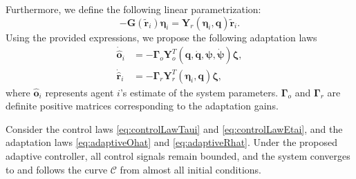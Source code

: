 Furthermore, we define the following linear parametrization:
\begin{equation}
    -\mathbf{G}(\widetilde{\mathbf{r}}_i)\boldsymbol{\eta}_i = \mathbf{Y}_r\left(\boldsymbol{\eta}_i, \mathbf{q}\right)\widetilde{\mathbf{r}}_i. \label{eq:linearParametrizationYrforEta}
\end{equation}
Using the provided expressions, we propose the following adaptation laws
\begin{align}
    \dot{\hat{\mathbf{o}}}_i &= -\boldsymbol{\Gamma}_o\mathbf{Y}^T_o\left(\mathbf{q},\dot{\mathbf{q}},\boldsymbol{\psi}, \dot{\boldsymbol{\psi}}\right)\boldsymbol{\zeta},  \label{eq:adaptiveOhat}\\
    \dot{\hat{\mathbf{r}}}_i &= -\boldsymbol{\Gamma}_r\mathbf{Y}^T_r\left(\boldsymbol{\eta}_i, \mathbf{q}\right)\boldsymbol{\zeta},  \label{eq:adaptiveRhat}
\end{align}
where $\hat{\mathbf{o}}_i$ represents agent $i$'s estimate of the system parameters. $\boldsymbol{\Gamma}_o$ and $\boldsymbol{\Gamma}_r$ are definite positive matrices corresponding to the adaptation gains.
\begin{theorem}
    Consider the control laws \eqref{eq:controlLawTaui} and \eqref{eq:controlLawEtai}, and the adaptation laws \eqref{eq:adaptiveOhat} and \eqref{eq:adaptiveRhat}. Under the proposed adaptive controller, all control signals remain bounded, and the system converges to and follows the curve $\mathcal{C}$ from almost all initial conditions.
\end{theorem}
